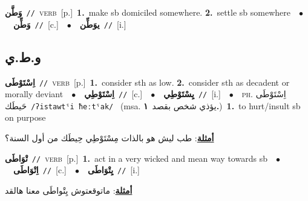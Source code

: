 \documentclass[10pt,a4paper,twoside]{article} %
\begin{document}
\begin{multicols}{2}
{\setlength\topsep{0pt}\textbf{\foreignlanguage{arabic}{وَطَّن}}\ {\color{gray}\texttt{//}\color{black}}\ \textsc{verb}\ [p.]\ \textbf{1.}~make sb domiciled somewhere.  \textbf{2.}~settle sb somewhere\ \ $\bullet$\ \ \setlength\topsep{0pt}\textbf{\foreignlanguage{arabic}{وَطِّن}}\ {\color{gray}\texttt{//}\color{black}}\ [c.]\ \ $\bullet$\ \ \setlength\topsep{0pt}\textbf{\foreignlanguage{arabic}{يوَطِّن}}\ {\color{gray}\texttt{//}\color{black}}\ [i.]\ } \vspace{2mm}

\vspace{-3mm}
\subsection*{\color{blue}\foreignlanguage{arabic}{و.ط.ي}\color{blue}{}} 

{\setlength\topsep{0pt}\textbf{\foreignlanguage{arabic}{اِسْتَوْطَى}}\ {\color{gray}\texttt{//}\color{black}}\ \textsc{verb}\ [p.]\ \textbf{1.}~consider sth as low.  \textbf{2.}~consider sth as decadent or morally deviant\ \ $\bullet$\ \ \setlength\topsep{0pt}\textbf{\foreignlanguage{arabic}{اِسْتَوْطِي}}\ {\color{gray}\texttt{//}\color{black}}\ [c.]\ \ $\bullet$\ \ \setlength\topsep{0pt}\textbf{\foreignlanguage{arabic}{يِسْتَوْطِي}}\ {\color{gray}\texttt{//}\color{black}}\ [i.]\ \ $\bullet$\ \ \textsc{ph.} \color{gray} \foreignlanguage{arabic}{اِسْتَوْطَى حَيطَك}\color{black}\ {\color{gray}\texttt{/{\sffamily ʔistawtˤi ħeːtˤak}/}\color{black}}\ \color{gray} (msa. \foreignlanguage{arabic}{يؤذي شخص بقصد}~\foreignlanguage{arabic}{\textbf{١.}})\color{black}\ \textbf{1.}~to hurt/insult sb on purpose\  \begin{flushright}\color{gray}\foreignlanguage{arabic}{\textbf{\underline{\foreignlanguage{arabic}{أمثلة}}}: طب ليش هو بالذات مِسْتَوْطِي حِيطَك من أول السنة؟}\end{flushright}\color{black}} \vspace{2mm}

{\setlength\topsep{0pt}\textbf{\foreignlanguage{arabic}{تْوَاطَى}}\ {\color{gray}\texttt{//}\color{black}}\ \textsc{verb}\ [p.]\ \textbf{1.}~act in a very wicked and mean way towards sb\ \ $\bullet$\ \ \setlength\topsep{0pt}\textbf{\foreignlanguage{arabic}{اِتْوَاطَى}}\ {\color{gray}\texttt{//}\color{black}}\ [c.]\ \ $\bullet$\ \ \setlength\topsep{0pt}\textbf{\foreignlanguage{arabic}{يِتْوَاطَى}}\ {\color{gray}\texttt{//}\color{black}}\ [i.]\  \begin{flushright}\color{gray}\foreignlanguage{arabic}{\textbf{\underline{\foreignlanguage{arabic}{أمثلة}}}: ماتوقعتوش يِتْواطَى معنا هالقد}\end{flushright}\color{black}} \vspace{2mm}


\end{multicols}
\end{document}
